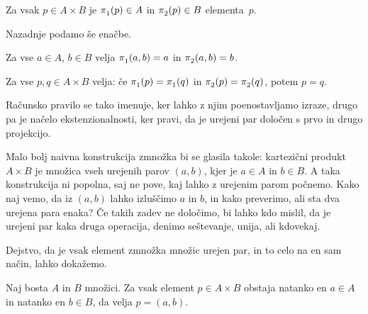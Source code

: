 \begin{pravilo}
  \label{pravilo:zmnozek-uporaba}
  Za vsak $p \in A \times B$ je $\fst(p) \in A$  in $\snd(p) \in B$
   elementa~$p$.
\end{pravilo}

Nazadnje podamo še enačbe.

\begin{pravilo}
  \label{pravilo:zmnozek-racunanje}
  Za vse $a \in A$, $b \in B$ velja $\fst(a, b) = a$ in $\snd(a, b) = b$.
\end{pravilo}

\begin{pravilo}
  \label{pravilo:zmnozek-ekstenzionalnost}
  Za vse $p, q \in A \times B$ velja: če $\fst(p) = \fst(q)$ in $\snd(p) = \snd(q)$,
  potem $p = q$.
\end{pravilo}

\noindent
%
Računsko pravilo se tako imenuje, ker lahko z njim poenostavljamo izraze, drugo pa je
načelo ekstenzionalnosti, ker pravi, da je urejeni par določen s prvo in drugo projekcijo.

Malo bolj naivna konstrukcija zmnožka bi se glasila takole: kartezični produkt
$A \times B$ je množica vseh urejenih parov $(a, b)$, kjer je $a \in A$ in $b \in B$. A
taka konstrukcija ni popolna, saj ne pove, kaj lahko z urejenim parom počnemo. Kako naj
vemo, da iz $(a, b)$ lahko izluščimo $a$ in $b$, in kako preverimo, ali sta dva urejena
para enaka? Če takih zadev ne določimo, bi lahko kdo mislil, da je urejeni par kaka druga
operacija, denimo seštevanje, unija, ali kdovekaj.

Dejstvo, da je vsak element zmnožka množic urejen par, in to celo na en sam način, lahko
dokažemo.

\begin{trditev}
  Naj bosta $A$ in $B$ množici. Za vsak element $p \in A \times B$ obstaja natanko en
  $a \in A$ in natanko en $b \in B$, da velja $p = (a, b)$.
\end{trditev}

